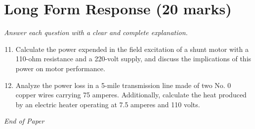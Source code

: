 \documentclass[12pt]{article}
\begin{document}
\section*{Long Form Response (20 marks)}
\textit{Answer each question with a clear and complete explanation.}
\begin{enumerate}[label=\arabic*.]
\setcounter{enumi}{10}
\item Calculate the power expended in the field excitation of a shunt motor with a 110-ohm resistance and a 220-volt supply, and discuss the implications of this power on motor performance.
\item Analyze the power loss in a 5-mile transmission line made of two No. 0 copper wires carrying 75 amperes. Additionally, calculate the heat produced by an electric heater operating at 7.5 amperes and 110 volts.
\end{enumerate}

\vfill
\noindent\textit{End of Paper}
\end{document}
